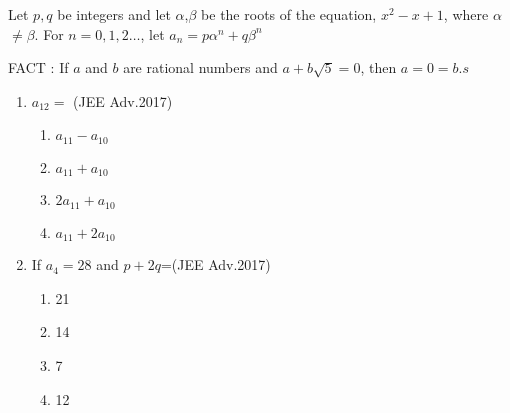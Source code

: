 \iffalse
  \title{Assignment}
  \author{AI24BTECH11022 - Pabbuleti Venkata Charan Teja}
  \section{paragraph}
\fi

\item
Let $p,q$ be integers and let $\alpha$,$\beta$ be the roots of the equation,
$x^{2}-x+1$, where $\alpha$$\neq$$\beta$. For $n=0,1,2\dots$, let ${a_{n}=p\alpha^{n}+q\beta^{n}}$

FACT : If $a$ and $b$ are rational numbers and $a+b\sqrt{5}=0$, then $a=0=b.s$

\begin{enumerate}
    
\item $a_{12}=$ \hfill(JEE Adv.2017)

\begin{enumerate}
\item $a_{11}-a_{10}$

\item $a_{11}+a_{10}$

\item $2a_{11}+a_{10}$

\item $a_{11}+2a_{10}$
\end{enumerate}
\item If $a_{4}=28$ and $p+2q$=\hfill(JEE Adv.2017)

\begin{multicols}{2}

\begin{enumerate}

\item
21
\item 14
\item
7
\item
12

\end{enumerate}

\end{multicols}
\end{enumerate}